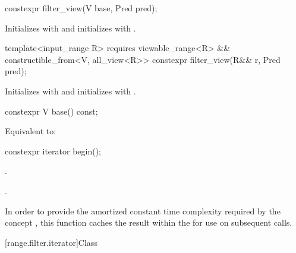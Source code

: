 \documentclass{wg21}
\begin{document}
%
\begin{itemdecl}
constexpr filter_view(V base, Pred pred);
\end{itemdecl}

\begin{itemdescr}
\pnum
\effects Initializes  with  and initializes
 with .
\end{itemdescr}

%
\begin{itemdecl}
template<input_range R>
requires viewable_range<R> && constructible_from<V, all_view<R>>
constexpr filter_view(R&& r, Pred pred);
\end{itemdecl}

\begin{itemdescr}
\pnum
\effects Initializes  with 
and initializes  with .
\end{itemdescr}

%
\begin{itemdecl}
constexpr V base() const;
\end{itemdecl}

\begin{itemdescr}
\pnum
\effects Equivalent to: 
\end{itemdescr}

%
\begin{itemdecl}
constexpr iterator begin();
\end{itemdecl}

\begin{itemdescr}
\pnum
\expects
{}.

\pnum
\returns
{}.

\pnum
\remarks In order to provide the amortized constant time complexity required by
the  concept , this function caches the result within the
 for use on subsequent calls.
\end{itemdescr}

[range.filter.iterator]{Class }
\end{document}
